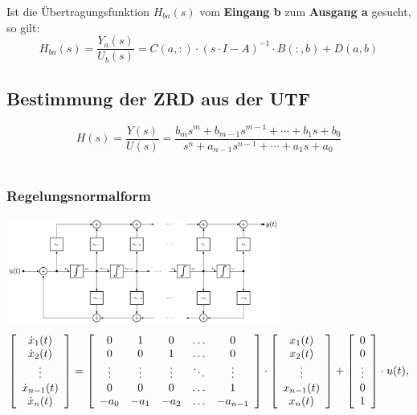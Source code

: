   Ist die Übertragungsfunktion $H_{ba}(s)$ vom \textbf{Eingang b} zum \textbf{Ausgang a} gesucht, so gilt:
  \[
    H_{ba}(s) = \frac{Y_a(s)}{U_b(s)} = C(a,:) \cdot (s \cdot I -A)^{-1} \cdot B(:,b) + D(a,b)
  \]


\subsection{Bestimmung der ZRD aus der UTF}
  \[ \boxed{
  H(s)=\frac{Y(s)}{U(s)}=\frac{b_{m} s^{m} + b_{m-1} s^{m-1} +\cdots+b_{1} s 
  + b_{0}}{s^{n} + a_{n-1} s^{n-1} + \cdots + a_{1} s + a_{0}}}
  \]\\


\subsubsection{Regelungsnormalform }
  \includegraphics[width=9cm]{./images/zrd-regelungsnormalform.png} \\
  \scriptsize
  \begin{equation*}
    \left [ 
    \begin{array}{c}
      \dot{x}_1(t)\\
      \dot{x}_2(t)\\
      \vdots\\
      \dot{x}_{n-1}(t)\\
      \dot{x}_{n}(t)\\
    \end{array}
    \right ] =
    \left [ 
    \begin{array}{c c c c c}
      0 & 1 & 0 & \ldots & 0\\
      0 & 0 & 1 & \ldots & 0\\
      \vdots & \vdots & \vdots & \ddots & \vdots\\
      0 & 0 & 0 & \ldots & 1\\
      -a_0 & -a_1 & -a_2 & \ldots & -a_{n-1}\\
    \end{array}
    \right ]\cdot
    \left [ 
    \begin{array}{c}
      x_1(t)\\
      x_2(t)\\
      \vdots \\
      x_{n-1}(t)\\
      x_{n}(t)\\
    \end{array}
    \right ]+
    \left [ 
    \begin{array}{c}
      0 \\
      0\\
      \vdots\\
      0\\
      1\\
    \end{array}
    \right ]\cdot
    u(t),
  \end{equation*}
